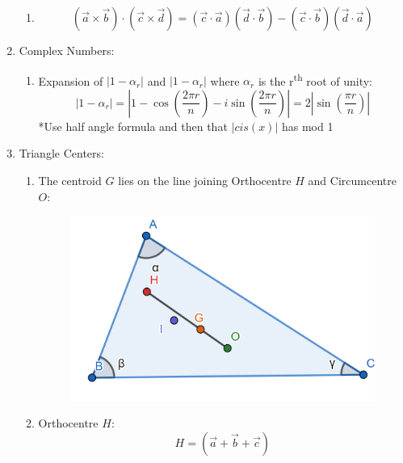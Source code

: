 \documentclass{article}
\numberwithin{equation}{section}
\numberwithin{figure}{section}
\newcommand{\Cr}{\times}
\begin{document}
\begin{enumerate}
\begin{enumerate}
			\item \begin{equation}
					(\vec{a} \Cr \vec{b}) \cdot (\vec{c} \Cr \vec{d})=(\vec{c} \cdot \vec{a})(\vec{d}\cdot\vec{b})-(\vec{c}\cdot\vec{b})(\vec{d}\cdot\vec{a})
				\end{equation}
		\end{enumerate}
	\item Complex Numbers:
		\begin{enumerate}
			\item Expansion of $|1-\alpha_r|$ and $|1-\alpha_r|$ where $\alpha_r$ is the r\textsuperscript{th} root of unity:
				\begin{equation}
					|1-\alpha_r|=\left|1-\cos\left(\frac{2\pi r}{n}\right)-i\sin\left(\frac{2\pi r}{n}\right)\right|=2\left| \sin\left(\frac{\pi r}{n}\right)\right|
				\end{equation}
			*Use half angle formula and then that $|cis(x)|$ has mod 1
		\end{enumerate}
	\item Triangle Centers:
		\begin{enumerate}
			\item The centroid $G$ lies on the line joining Orthocentre $H$ and Circumcentre $O$:
				\begin{centering}
					\begin{figure}[h]
						\includegraphics[scale=0.25]{Triangle_Pic.png}
					\end{figure}
				\end{centering}
			\item Orthocentre $H$: \begin{equation}H= \left(\vec{a}+\vec{b}+\vec{c}\right)\end{equation}
		\end{enumerate}

\end{enumerate}
\end{document}
